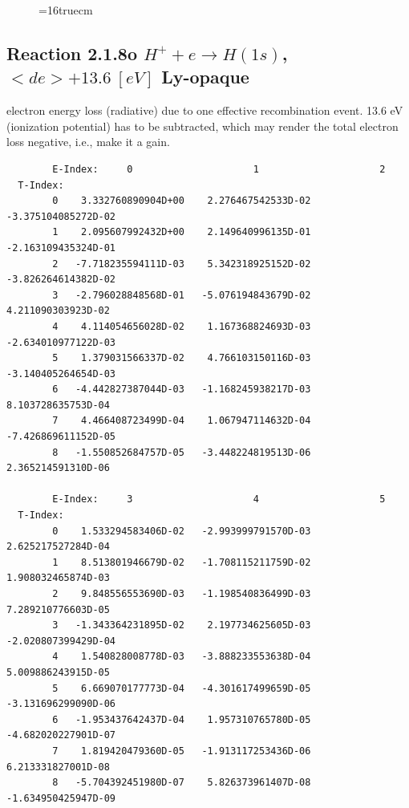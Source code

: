 \documentclass[12pt,dvipdfmx]{article}
\begin{document}
\begin{figure} \label{2.1.8lr2}
\epsfxsize=16truecm
\end{figure}
\newpage




\subsection{
  Reaction 2.1.8o $H^+ + e \rightarrow H(1s) $, \ $ <de> + 13.6 \ [eV] $
  Ly-opaque
}

  electron energy loss (radiative) due to one effective recombination event.
  13.6 eV (ionization potential) has to be
  subtracted, which may render the total electron loss negative, i.e., make it a gain.

\begin{small}\begin{verbatim}
        E-Index:     0                     1                     2
  T-Index:
        0    3.332760890904D+00    2.276467542533D-02   -3.375104085272D-02
        1    2.095607992432D+00    2.149640996135D-01   -2.163109435324D-01
        2   -7.718235594111D-03    5.342318925152D-02   -3.826264614382D-02
        3   -2.796028848568D-01   -5.076194843679D-02    4.211090303923D-02
        4    4.114054656028D-02    1.167368824693D-03   -2.634010977122D-03
        5    1.379031566337D-02    4.766103150116D-03   -3.140405264654D-03
        6   -4.442827387044D-03   -1.168245938217D-03    8.103728635753D-04
        7    4.466408723499D-04    1.067947114632D-04   -7.426869611152D-05
        8   -1.550852684757D-05   -3.448224819513D-06    2.365214591310D-06

        E-Index:     3                     4                     5
  T-Index:
        0    1.533294583406D-02   -2.993999791570D-03    2.625217527284D-04
        1    8.513801946679D-02   -1.708115211759D-02    1.908032465874D-03
        2    9.848556553690D-03   -1.198540836499D-03    7.289210776603D-05
        3   -1.343364231895D-02    2.197734625605D-03   -2.020807399429D-04
        4    1.540828008778D-03   -3.888233553638D-04    5.009886243915D-05
        5    6.669070177773D-04   -4.301617499659D-05   -3.131696299090D-06
        6   -1.953437642437D-04    1.957310765780D-05   -4.682020227901D-07
        7    1.819420479360D-05   -1.913117253436D-06    6.213331827001D-08
        8   -5.704392451980D-07    5.826373961407D-08   -1.634950425947D-09


\end{verbatim}
\end{small}
\end{document}
